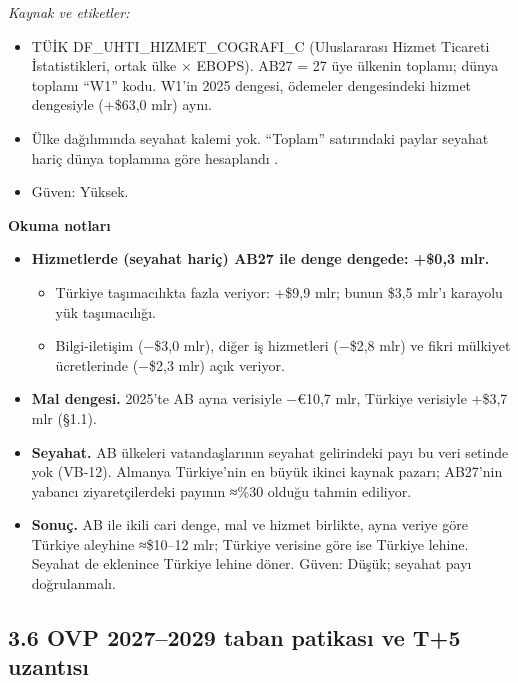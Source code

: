 \endgroup

\emph{Kaynak ve etiketler:}

\begin{itemize}
\tightlist
\item
  \etiketV{} TÜİK DF\_UHTI\_HIZMET\_COGRAFI\_C (Uluslararası Hizmet Ticareti İstatistikleri, ortak ülke × EBOPS). AB27 = 27 üye ülkenin toplamı; dünya toplamı ``W1'' kodu. W1'in 2025 dengesi, ödemeler dengesindeki hizmet dengesiyle (+\$63,0 mlr) aynı.
\item
  Ülke dağılımında seyahat kalemi yok. ``Toplam'' satırındaki paylar seyahat hariç dünya toplamına göre hesaplandı \etiketT{}.
\item
  Güven: Yüksek.
\end{itemize}

\textbf{Okuma notları}

\begin{itemize}
\tightlist
\item
  \textbf{Hizmetlerde (seyahat hariç) AB27 ile denge dengede: +\$0,3 mlr.}

  \begin{itemize}
  \tightlist
  \item
    Türkiye taşımacılıkta fazla veriyor: +\$9,9 mlr; bunun \$3,5 mlr'ı karayolu yük taşımacılığı.
  \item
    Bilgi-iletişim (−\$3,0 mlr), diğer iş hizmetleri (−\$2,8 mlr) ve fikri mülkiyet ücretlerinde (−\$2,3 mlr) açık veriyor.
  \end{itemize}
\item
  \textbf{Mal dengesi.} 2025'te AB ayna verisiyle −€10,7 mlr, Türkiye verisiyle +\$3,7 mlr (§1.1).
\item
  \textbf{Seyahat.} AB ülkeleri vatandaşlarının seyahat gelirindeki payı bu veri setinde yok (VB-12). Almanya Türkiye'nin en büyük ikinci kaynak pazarı; AB27'nin yabancı ziyaretçilerdeki payının ≈\%30 olduğu tahmin ediliyor. \etiketD{}
\item
  \textbf{Sonuç.} AB ile ikili cari denge, mal ve hizmet birlikte, ayna veriye göre Türkiye aleyhine ≈\$10--12 mlr; Türkiye verisine göre ise Türkiye lehine. Seyahat de eklenince Türkiye lehine döner. \etiketT{} Güven: Düşük; seyahat payı doğrulanmalı.
\end{itemize}

\hypertarget{01_teshis-36-ovp-20272029-taban-patikasux131-ve-t5-uzantux131sux131}{%
\subsection{3.6 OVP 2027--2029 taban patikası ve T+5 uzantısı}\label{01_teshis-36-ovp-20272029-taban-patikasux131-ve-t5-uzantux131sux131}}

